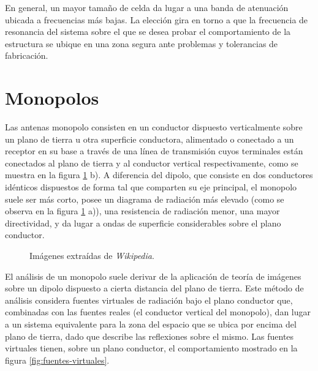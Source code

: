 
En general, un mayor tamaño de celda da lugar a una banda de atenuación ubicada a frecuencias más bajas. La elección gira en torno a que la frecuencia de resonancia del sistema sobre el que se desea probar el comportamiento de la estructura se ubique en una zona segura ante problemas y tolerancias de fabricación.

\section{Monopolos}

Las antenas monopolo consisten en un conductor dispuesto verticalmente sobre un plano de tierra u otra superficie conductora, alimentado o conectado a un receptor en su base a través de una línea de transmisión cuyos terminales están conectados al plano de tierra y al conductor vertical respectivamente, como se muestra en la figura \ref{fig:monopolos} b). A diferencia del dipolo, que consiste en dos conductores idénticos dispuestos de forma tal que comparten su eje principal, el monopolo suele ser más corto, posee un diagrama de radiación más elevado (como se observa en la figura \ref{fig:monopolos} a)), una resistencia de radiación menor, una mayor directividad, y da lugar a ondas de superficie considerables sobre el plano conductor.


\begin{figure}[H]
	\centering 
	\hspace{30pt}
	\caption{Imágenes extraídas de \textit{Wikipedia}.}
	\label{fig:monopolos}
\end{figure}


El análisis de un monopolo suele derivar de la aplicación de teoría de imágenes sobre un dipolo dispuesto a cierta distancia del plano de tierra. Este método de análisis considera fuentes virtuales de radiación bajo el plano conductor que, combinadas con las fuentes reales (el conductor vertical del monopolo), dan lugar a un sistema equivalente para la zona del espacio que se ubica por encima del plano de tierra, dado que describe las reflexiones sobre el mismo. Las fuentes virtuales tienen, sobre un plano conductor, el comportamiento mostrado en la figura \ref{fig:fuentes-virtuales}.


